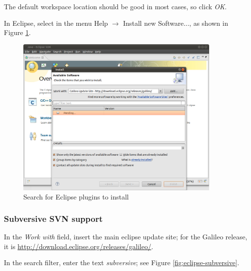 \documentclass[a4paper, 10pt]{article}
\begin{document}
The default workspace location should be good in most cases, so click \emph{OK}.

In Eclipse, select in the menu Help $\rightarrow$ Install new Software..., as shown in
Figure \ref{fig:eclipse-update}.

    \begin{figure}[H]
    \centering
        \includegraphics[width=0.9\textwidth]{./install-guide-linux-images/eclipse-update.png}
        \caption{Search for Eclipse plugins to install}
        \label{fig:eclipse-update}
    \end{figure}




\subsubsection{Subversive SVN support}


In the \emph{Work with} field, insert the main eclipse update site;
for the Galileo release, it is
\url{http://download.eclipse.org/releases/galileo/}.

In the search filter, enter the text \emph{subversive};
see Figure \ref{fig:eclipse-subversive}.
\end{document}
